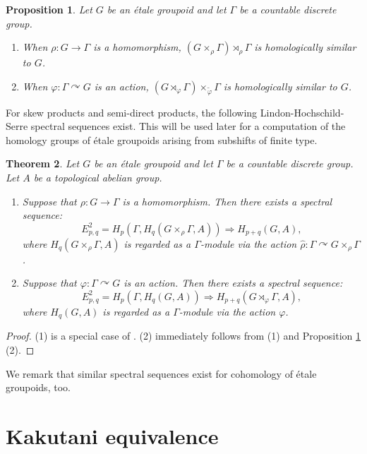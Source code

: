 \documentclass[11pt]{article}
\newtheorem{thm}{Theorem}[section]
\newtheorem{prop}[thm]{Proposition}
\theoremstyle{definition}
\renewcommand{\phi}{\varphi}
\begin{document}
\begin{prop}\label{Takai}
Let $G$ be an \'etale groupoid and 
let $\Gamma$ be a countable discrete group. 
\begin{enumerate}
\item When $\rho:G\to\Gamma$ is a homomorphism, 
$(G\times_\rho\Gamma)\rtimes_{\hat\rho}\Gamma$ is 
homologically similar to $G$. 
\item When $\phi:\Gamma\curvearrowright G$ is an action, 
$(G\rtimes_\phi\Gamma)\times_{\tilde\phi}\Gamma$ is 
homologically similar to $G$. 
\end{enumerate}
\end{prop}

For skew products and semi-direct products, 
the following Lindon-Hochschild-Serre spectral sequences exist. 
This will be used later 
for a computation of the homology groups of 
\'etale groupoids arising from subshifts of finite type. 

\begin{thm}\label{LHS}
Let $G$ be an \'etale groupoid and 
let $\Gamma$ be a countable discrete group. 
Let $A$ be a topological abelian group. 
\begin{enumerate}
\item Suppose that $\rho:G\to\Gamma$ is a homomorphism. 
Then there exists a spectral sequence: 
\[
E^2_{p,q}=H_p(\Gamma,H_q(G\times_\rho\Gamma,A))\Rightarrow
H_{p+q}(G,A), 
\]
where $H_q(G\times_\rho\Gamma,A)$ is regarded as a $\Gamma$-module 
via the action $\hat\rho:\Gamma\curvearrowright G\times_\rho\Gamma$. 
\item Suppose that $\phi:\Gamma\curvearrowright G$ is an action. 
Then there exists a spectral sequence: 
\[
E^2_{p,q}=H_p(\Gamma,H_q(G,A))\Rightarrow
H_{p+q}(G\rtimes_\phi\Gamma,A), 
\]
where $H_q(G,A)$ is regarded as a $\Gamma$-module via the action $\phi$. 
\end{enumerate}
\end{thm}
\begin{proof}
(1) is a special case of \cite[Theorem 4.4]{CM}. 
(2) immediately follows from (1) and Proposition \ref{Takai} (2). 
\end{proof}

We remark that 
similar spectral sequences exist for cohomology of \'etale groupoids, too. 




\section{Kakutani equivalence}
\end{document}
